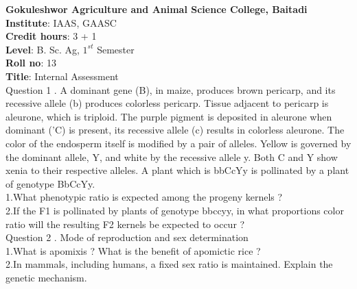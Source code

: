 \documentclass[12pt]{article}\usepackage[]{graphicx}\usepackage[]{color}
\begin{document}
{            \Large{\textbf{Gokuleshwor Agriculture and Animal Science College, Baitadi}} \\[0.25cm]
            \textbf{Institute}: IAAS, GAASC \\}\textbf{Credit hours}: 3 + 1 \\\textbf{Level}: B. Sc. Ag, $1^{st}$ Semester \\\textbf{Roll no}: 13 \\\textbf{Title}: Internal Assessment \\[1cm]Question 1 . A dominant gene (B), in maize, produces brown pericarp, and its recessive allele (b) produces colorless pericarp. Tissue adjacent to pericarp is aleurone, which is triploid. The purple pigment is deposited in aleurone when dominant ('C) is present, its recessive allele (c) results in colorless aleurone. The color of the endosperm itself is modified by a pair of alleles. Yellow is governed by the dominant allele, Y, and white by the recessive allele y. Both C and Y show xenia to their respective alleles. A plant which is bbCcYy is pollinated by a plant of genotype BbCcYy. \\\hspace{0.5cm}1.What phenotypic ratio is expected among the progeny kernels ?\\\hspace{0.5cm}2.If the F1 is pollinated by plants of genotype bbccyy, in what proportions color ratio will the resulting F2 kernels be expected to occur ?\\Question 2 . Mode of reproduction and sex determination \\\hspace{0.5cm}1.What is apomixis ? What is the benefit of apomictic rice ?\\\hspace{0.5cm}2.In mammals, including humans, a fixed sex ratio is maintained. Explain the genetic mechanism.\\
\end{document}
